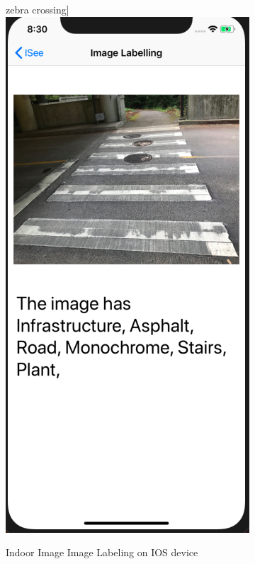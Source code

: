 \documentclass[11pt]{ucscthesis}
\begin{document}
\begin{figure}
zebra crossing]{\includegraphics{Fig/RoadImageLabelling.png}}
  \hfill
\caption{Indoor Image Image Labeling on IOS device}
\end{figure}
\end{document}
